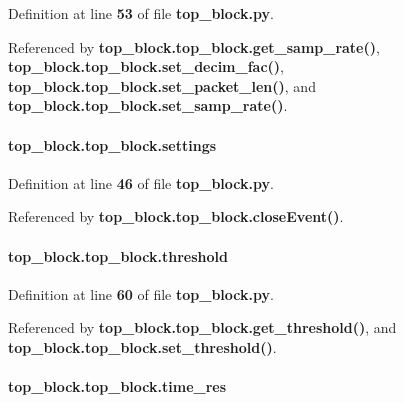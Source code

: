 Definition at line {\bf 53} of file {\bf top\+\_\+block.\+py}.



Referenced by {\bf top\+\_\+block.\+top\+\_\+block.\+get\+\_\+samp\+\_\+rate()}, {\bf top\+\_\+block.\+top\+\_\+block.\+set\+\_\+decim\+\_\+fac()}, {\bf top\+\_\+block.\+top\+\_\+block.\+set\+\_\+packet\+\_\+len()}, and {\bf top\+\_\+block.\+top\+\_\+block.\+set\+\_\+samp\+\_\+rate()}.

\paragraph[{settings}]{\setlength{\rightskip}{0pt plus 5cm}top\+\_\+block.\+top\+\_\+block.\+settings}\label{classtop__block_1_1top__block_aca45dfd233091739b1dacad53f862bb4}


Definition at line {\bf 46} of file {\bf top\+\_\+block.\+py}.



Referenced by {\bf top\+\_\+block.\+top\+\_\+block.\+close\+Event()}.

\paragraph[{threshold}]{\setlength{\rightskip}{0pt plus 5cm}top\+\_\+block.\+top\+\_\+block.\+threshold}\label{classtop__block_1_1top__block_adcfd5409c737c5899c64953ce27d8ddf}


Definition at line {\bf 60} of file {\bf top\+\_\+block.\+py}.



Referenced by {\bf top\+\_\+block.\+top\+\_\+block.\+get\+\_\+threshold()}, and {\bf top\+\_\+block.\+top\+\_\+block.\+set\+\_\+threshold()}.

\paragraph[{time\+\_\+res}]{\setlength{\rightskip}{0pt plus 5cm}top\+\_\+block.\+top\+\_\+block.\+time\+\_\+res}\label{classtop__block_1_1top__block_af1aa62efa20a2ba9d3c798a9574bc6a5}


